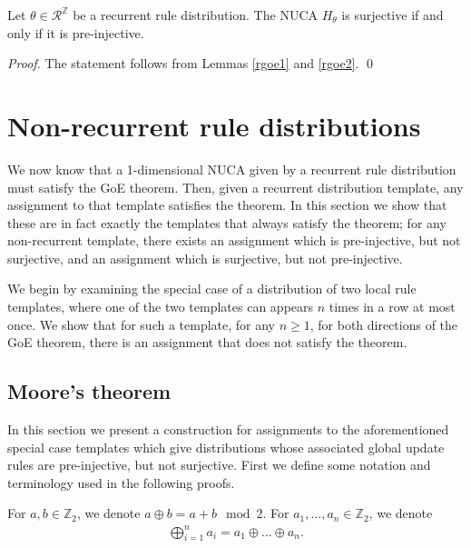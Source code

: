 \documentclass[runningheads]{llncs}
\newcommand{\Z}{\mathbb{Z}}
\begin{document}
\begin{theorem}
Let $\theta \in \mathcal{R}^\Z$ be a recurrent rule distribution. The NUCA $H_\theta$ is surjective if and only if it is pre-injective.
\end{theorem}

\begin{proof}
The statement follows from Lemmas \ref{rgoe1} and \ref{rgoe2}.
\qed
\end{proof}


\section{Non-recurrent rule distributions}

We now know that a 1-dimensional NUCA given by a recurrent rule distribution must satisfy the GoE theorem. Then, given a recurrent distribution template, any assignment to that template satisfies the theorem. In this section we show that these are in fact exactly the templates that always satisfy the theorem; for any non-recurrent template, there exists an assignment which is pre-injective, but not surjective, and an assignment which is surjective, but not pre-injective.

We begin by examining the special case of a distribution of two local rule templates, where one of the two templates can appears $n$ times in a row at most once. We show that for such a template, for any $n\geq 1$, for both directions of the GoE theorem, there is an assignment that does not satisfy the theorem.

\subsection{Moore's theorem}

In this section we present a construction for assignments to the aforementioned special case templates which give distributions whose associated global update rules are pre-injective, but not surjective. First we define some notation and terminology used in the following proofs.

\begin{notation}
For $a,b \in \Z_2$, we denote $a \oplus b = a + b \mod 2$. For $a_1,\ldots,a_n \in \Z_2$, we denote
\begin{align*}
\bigoplus_{i=1}^{n} a_i = a_1 \oplus \ldots \oplus a_n.
\end{align*}
\end{notation} 
\end{document}
